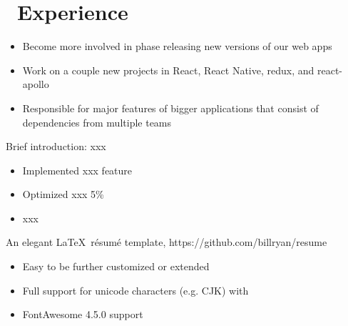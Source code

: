 \documentclass{resume}
\begin{document}



\section{\faUsers\ Experience}
\begin{itemize}
  \item Become more involved in phase releasing new versions of our web apps
  \item Work on a couple new projects in React, React Native, redux, and react-apollo
  \item Responsible for major features of bigger applications that consist of dependencies from multiple teams
\end{itemize}

Brief introduction: xxx
\begin{itemize}
  \item Implemented xxx feature
  \item Optimized xxx 5\%
  \item xxx
\end{itemize}

An elegant \LaTeX\ résumé template, https://github.com/billryan/resume
\begin{itemize}
  \item Easy to be further customized or extended
  \item Full support for unicode characters (e.g. CJK) with \XeLaTeX\
  \item FontAwesome 4.5.0 support
\end{itemize}

\end{document}
